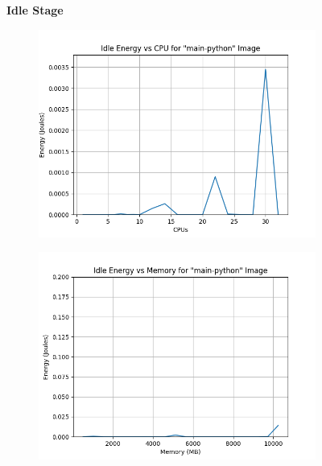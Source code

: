 \documentclass[times, 10pt,twocolumn]{article}
\begin{document}
\begin{figure}[ht]
   \textbf{Idle Stage}\par\medskip
   \begin{subfigure}[b]{0.3\textwidth}
      \includegraphics[width=\textwidth]{imgs/container_study/idle_vs_cpu.png}
     \caption{}
     \label{fig:idle_cpu}
   \end{subfigure}
   \hfill
   \begin{subfigure}[b]{0.3\textwidth}
      \includegraphics[width=\textwidth]{imgs/container_study/idle_vs_mem.png}
     \caption{}
     \label{fig:idle_mem}
   \end{subfigure}
   \hfill
   \begin{subfigure}[b]{0.3\textwidth}

\end{subfigure}
\end{figure}
\end{document}
